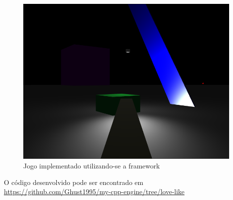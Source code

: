 \begin{figure}[]
  \includegraphics[width=\linewidth]{Cap-Desenvolvimento/gamedoom.png}
  \caption{Jogo implementado utilizando-se a framework}
  \label{des:gamedoom}
\end{figure}

O código desenvolvido pode ser encontrado em \url{https://github.com/Ghust1995/my-cpp-engine/tree/love-like}

